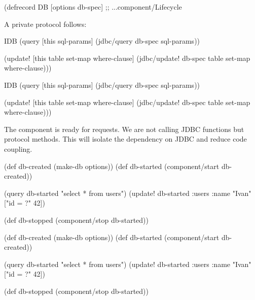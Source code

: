 \begin{english}
  \begin{clojure}
(defrecord DB [options db-spec]
  ;; ...component/Lifecycle
  \end{clojure}
\end{english}

\noindent
A private protocol follows:

\ifnarrow

\begin{english}
  \begin{clojure}
  IDB
  (query [this sql-params]
    (jdbc/query db-spec sql-params))

  (update!
    [this table set-map where-clause]
    (jdbc/update! db-spec
      table set-map where-clause)))
  \end{clojure}
\end{english}

\else

\begin{english}
  \begin{clojure}
  IDB
  (query [this sql-params]
    (jdbc/query db-spec sql-params))

  (update! [this table set-map where-clause]
    (jdbc/update! db-spec table set-map where-clause)))
  \end{clojure}
\end{english}

\fi

The component is ready for requests. We are not calling JDBC functions but protocol methods. This will isolate the dependency on JDBC and reduce code coupling.

\ifnarrow

\begin{english}
  \begin{clojure}
(def db-created (make-db options))
(def db-started
  (component/start db-created))

(query db-started "select * from users")
(update! db-started
  :users {:name "Ivan"} ["id = ?" 42])

(def db-stopped
  (component/stop db-started))
  \end{clojure}
\end{english}

\else

\begin{english}
  \begin{clojure}
(def db-created (make-db options))
(def db-started (component/start db-created))

(query db-started "select * from users")
(update! db-started :users {:name "Ivan"} ["id = ?" 42])

(def db-stopped (component/stop db-started))
  \end{clojure}
\end{english}

